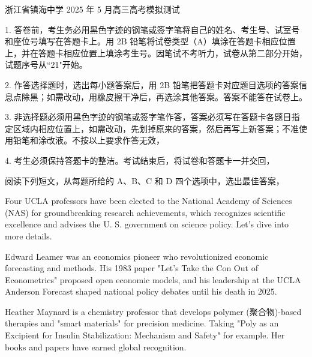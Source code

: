 \documentclass{英语试卷}
\begin{document}
\par 浙江省镇海中学 2025 年 5 月高三高考模拟测试\par
\begin{notice}
\par 1. 答卷前，考生务必用黑色字迹的钢笔或签字笔将自己的姓名、考生号、试室号和座位号填写在答题卡上。用 2B 铅笔将试卷类型（A）填涂在答题卡相应位置上，并在答题卡相应位置上填涂考生号。因笔试不考听力，试卷从第二部分开始，试题序号从“21"开始。\par
\par 2. 作答选择题时，选出每小题答案后，用 2B 铅笔把答题卡对应题目选项的答案信息点除黑；如需改动，用橡皮擦干净后，再选涂其他答案。答案不能答在试卷上。\par
\par 3. 非选择题必须用黑色字迹的钢笔或签字笔作答，答案必须写在答题卡各题目指定区域内相应位置上，如需改动，先划掉原来的答案，然后再写上新答案；不准使用铅笔和涂改液。不按以上要求作答无效，\par
\par 4. 考生必须保持答题卡的整洁。考试结束后，将试卷和答题卡一并交回，\par
\end{notice}
\par 阅读下列短文，从每题所给的 A、B、C 和 D 四个选项中，选出最佳答案，\par
{}
\par Four UCLA professors have been elected to the National Academy of Sciences (NAS) for groundbreaking research achievements, which recognizes scientific excellence and advises the U. S. government on science policy. Let's dive into more details.\par
\par Edward Leamer was an economics pioneer who revolutionized economic forecasting and methods. His 1983 paper "Let's Take the Con Out of Econometrics" proposed open economic models, and his leadership at the UCLA Anderson Forecast shaped national policy debates until his death in 2025.\par
\par Heather Maynard is a chemistry professor that develops polymer (聚合物)-based therapies and "smart materials" for precision medicine. Taking "Poly as an Excipient for Insulin Stabilization: Mechanism and Safety" for example. Her books and papers have earned global recognition.\par
\end{document}
